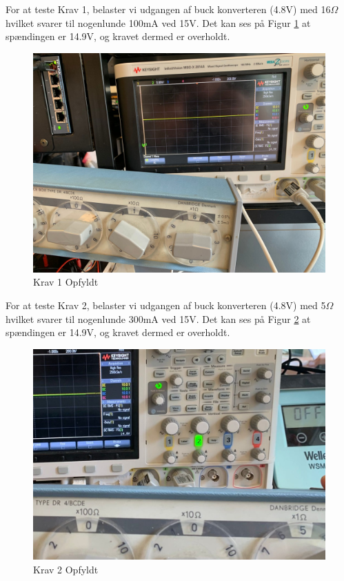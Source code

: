 \documentclass[../main.tex]{subfiles}
\begin{document}
For at teste Krav 1, belaster vi udgangen af buck konverteren (4.8V) med 16$\Omega$ hvilket svarer til nogenlunde 100mA ved 15V. Det kan ses på Figur \ref{fig: Krav 1 Opfyldt} at spændingen er 14.9V, og kravet dermed er overholdt.
\begin{figure}[H]
      \includegraphics[width=\textwidth]{Dokumentation/Pictures/Krav1.jpg}
     \caption{Krav 1 Opfyldt}
     \label{fig: Krav 1 Opfyldt}
     \end{figure}

For at teste Krav 2, belaster vi udgangen af buck konverteren (4.8V) med 5$\Omega$ hvilket svarer til nogenlunde 300mA ved 15V. Det kan ses på Figur \ref{fig: Krav 2 Opfyldt} at spændingen er 14.9V, og kravet dermed er overholdt.
\begin{figure}[H]
      \includegraphics[width=\textwidth]{Dokumentation/Pictures/Krav2.jpg}
     \caption{Krav 2 Opfyldt}
     \label{fig: Krav 2 Opfyldt}
     \end{figure}
\end{document}
